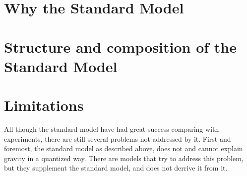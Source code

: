 \section*{Why the Standard Model}



\section*{Structure and  composition of the Standard Model}



\section*{Limitations}
All though the standard model have had great success comparing with experiments,
there are still several problems not addressed by it. First and foremost, the standard model
as described above, does not and cannot explain gravity in a quantized way. There 
are models that try to address this problem, but they supplement the standard model,
and does not derrive it from it. 